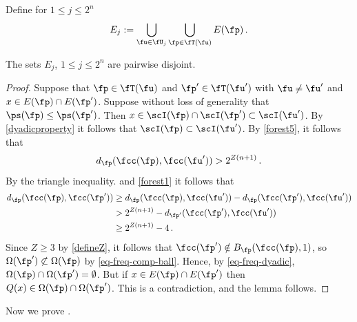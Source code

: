 Define for $1 \le j \le 2^n$
$$
    E_j := \bigcup_{\fu \in \fU_j} \bigcup_{\fp \in \fT(\fu)} E(\fp)\,.
$$

\begin{lemma}
    \label{disjoint-row-support}
    The sets $E_j$, $1 \le j \le 2^n$ are pairwise disjoint.
\end{lemma}

\begin{proof}
    Suppose that $\fp \in \fT(\fu)$ and $\fp' \in \fT(\fu')$ with $\fu \ne \fu'$ and $x \in E(\fp) \cap E(\fp')$. Suppose without loss of generality that $\ps(\fp) \le \ps(\fp')$. Then $x \in \scI(\fp) \cap \scI(\fp') \subset \scI(\fu')$. By \eqref{dyadicproperty} it follows that $\scI(\fp) \subset \scI(\fu')$. By \eqref{forest5}, it follows that
    $$
        d_{\fp}(\fcc(\fp), \fcc(\fu')) > 2^{Z(n+1)}\,.
    $$
    By the triangle inequality.  and \eqref{forest1} it follows that
    \begin{align*}
        d_{\fp}(\fcc(\fp), \fcc(\fp')) &\ge d_{\fp}(\fcc(\fp), \fcc(\fu')) - d_{\fp}(\fcc(\fp'), \fcc(\fu'))\\
        &> 2^{Z(n+1)} - d_{\fp'}(\fcc(\fp'), \fcc(\fu'))\\
        &\ge 2^{Z(n+1)} - 4\,.
    \end{align*}
    Since $Z \ge 3$ by \eqref{defineZ}, it follows that $\fcc(\fp') \notin B_{\fp}(\fcc(\fp), 1)$, so $\Omega(\fp') \not\subset \Omega(\fp)$ by \eqref{eq-freq-comp-ball}. Hence, by \eqref{eq-freq-dyadic}, $\Omega(\fp) \cap \Omega(\fp') = \emptyset$. But if $x \in E(\fp) \cap E(\fp')$ then $Q(x) \in \Omega(\fp) \cap \Omega(\fp')$. This is a contradiction, and the lemma follows.
\end{proof}

Now we prove .

